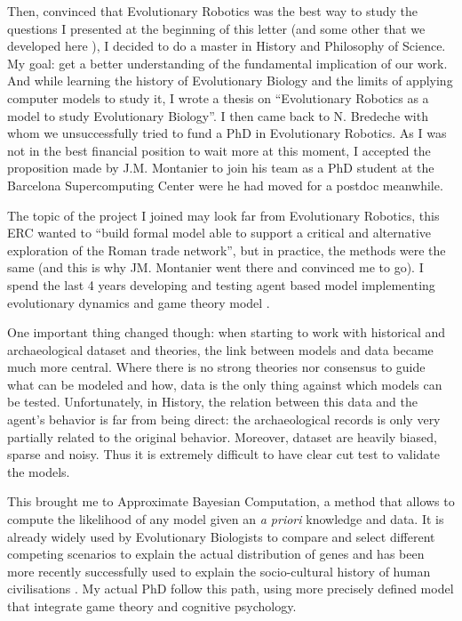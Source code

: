 \documentclass[10pt]{article}
\begin{document}
Then, convinced that Evolutionary Robotics was the best way to study the questions I presented at the beginning of this letter (and some other that we developed here \cite{bredeche11evolutionaryadaptationpopulationrobots}),  I decided to do a master in History and Philosophy of Science. My goal: get a  better understanding of the fundamental implication of our work. And while learning the history of Evolutionary Biology and the limits of applying computer models to study it, I wrote a thesis on ``Evolutionary Robotics as a model to study Evolutionary Biology''.  I then came back to N. Bredeche with whom we unsuccessfully tried to fund a PhD in Evolutionary Robotics. As I was not in the best financial position to wait more at this moment, I accepted the proposition made by J.M. Montanier to join his team as a PhD student at the Barcelona Supercomputing Center were he had moved for a postdoc meanwhile.

The topic of the project I joined may look far from Evolutionary Robotics, this ERC wanted to ``build formal model able to support a critical and alternative exploration of the Roman trade network'', but in practice, the methods were the same (and this is why JM. Montanier went there and convinced me to go). I spend the last 4 years developing and testing agent based model implementing evolutionary dynamics and game theory model  \cite{carrignon2015modelingthecoevolutionoftradeandcultureinpastsocieties}. 

One important thing changed though: when starting to work with historical and archaeological dataset and theories, the link between models and data became much more central. Where there is no strong theories nor consensus to guide what can be modeled and how, data is the only thing against which models can be tested. Unfortunately, in History, the relation between this data and the agent's behavior is far from being direct: the archaeological records is only very partially related to the original behavior. Moreover, dataset are heavily biased, sparse and noisy. Thus it is extremely difficult to have clear cut test to validate the models. 

This brought me to Approximate Bayesian Computation, a method that allows to compute the likelihood of any model given an \emph{a priori} knowledge and data. It is already widely used by Evolutionary Biologists to compare and select different competing scenarios to explain the actual distribution of genes \cite{beaumont2009adaptiveapproximatebayesiancomputation} and has been more recently successfully used to explain the socio-cultural history of human civilisations \cite{rubiocampillo2016modelselectioninhistoricalresearchusingapproximatebayesiancomputation,kandler2017inferringindividuallevelprocessesfrompopulationlevelpatternsinculturalevolution}. My actual PhD follow this path, using more precisely defined model that integrate game theory and cognitive psychology. 
\end{document}
